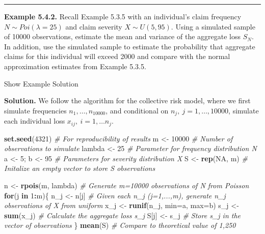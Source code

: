 \documentclass[]{book}
\newenvironment{Shaded}{\begin{snugshade}}{\end{snugshade}}
\newcommand{\KeywordTok}[1]{\textcolor[rgb]{0.13,0.29,0.53}{\textbf{#1}}}
\newcommand{\DataTypeTok}[1]{\textcolor[rgb]{0.13,0.29,0.53}{#1}}
\newcommand{\DecValTok}[1]{\textcolor[rgb]{0.00,0.00,0.81}{#1}}
\newcommand{\StringTok}[1]{\textcolor[rgb]{0.31,0.60,0.02}{#1}}
\newcommand{\CommentTok}[1]{\textcolor[rgb]{0.56,0.35,0.01}{\textit{#1}}}
\newcommand{\OtherTok}[1]{\textcolor[rgb]{0.56,0.35,0.01}{#1}}
\newcommand{\ControlFlowTok}[1]{\textcolor[rgb]{0.13,0.29,0.53}{\textbf{#1}}}
\newcommand{\OperatorTok}[1]{\textcolor[rgb]{0.81,0.36,0.00}{\textbf{#1}}}
\newcommand{\NormalTok}[1]{#1}
\theoremstyle{definition}
\theoremstyle{definition}
\theoremstyle{definition}
\theoremstyle{remark}
\begin{document}
\begin{center}\rule{0.5\linewidth}{\linethickness}\end{center}

\textbf{Example 5.4.2.} Recall Example 5.3.5 with an individual's claim
frequency \(N \sim Poi(\lambda=25)\) and claim severity
\(X \sim U(5,95)\). Using a simulated sample of 10000 observations,
estimate the mean and variance of the aggregate loss \(S_N\). In
addition, use the simulated sample to estimate the probability that
aggregate claims for this individual will exceed 2000 and compare with
the normal approximation estimates from Example 5.3.5.

Show Example Solution

\hypertarget{toggleExampleAggLoss.4.2}{}
\textbf{Solution.} We follow the algorithm for the collective risk
model, where we first simulate frequencies \(n_1,\ldots,n_{10000}\), and
conditional on \(n_j,~j=1,\ldots,10000\), simulate each individual loss
\(x_{ij},~i=1,\ldots n_j\).

\begin{Shaded}
\begin{Highlighting}[]
\KeywordTok{set.seed}\NormalTok{(}\DecValTok{4321}\NormalTok{)  }\CommentTok{# For reproducibility of results}
\NormalTok{m <-}\StringTok{ }\DecValTok{10000}      \CommentTok{# Number of observations to simulate}
\NormalTok{lambda <-}\StringTok{ }\DecValTok{25}    \CommentTok{# Parameter for frequency distribution N}
\NormalTok{a <-}\StringTok{ }\DecValTok{5}\NormalTok{; b <-}\StringTok{ }\DecValTok{95} \CommentTok{# Parameters for severity distribution X}
\NormalTok{S <-}\StringTok{ }\KeywordTok{rep}\NormalTok{(}\OtherTok{NA}\NormalTok{, m) }\CommentTok{# Initalize an empty vector to store S observations}

\NormalTok{n <-}\StringTok{ }\KeywordTok{rpois}\NormalTok{(m, lambda) }\CommentTok{# Generate m=10000 observations of N from Poisson}
\ControlFlowTok{for}\NormalTok{(j }\ControlFlowTok{in} \DecValTok{1}\OperatorTok{:}\NormalTok{m)\{ }
\NormalTok{  n_j <-}\StringTok{ }\NormalTok{n[j] }\CommentTok{# Given each n_j (j=1,...,m), generate n_j observations of X from uniform}
\NormalTok{  x_j <-}\StringTok{ }\KeywordTok{runif}\NormalTok{(n_j, }\DataTypeTok{min=}\NormalTok{a, }\DataTypeTok{max=}\NormalTok{b)}
\NormalTok{  s_j <-}\StringTok{ }\KeywordTok{sum}\NormalTok{(x_j) }\CommentTok{# Calculate the aggregate loss s_j}
\NormalTok{  S[j] <-}\StringTok{ }\NormalTok{s_j }\CommentTok{# Store s_j in the vector of observations}
\NormalTok{\}}
\KeywordTok{mean}\NormalTok{(S) }\CommentTok{# Compare to theoretical value of 1,250}
\end{Highlighting}
\end{Shaded}
\end{document}
